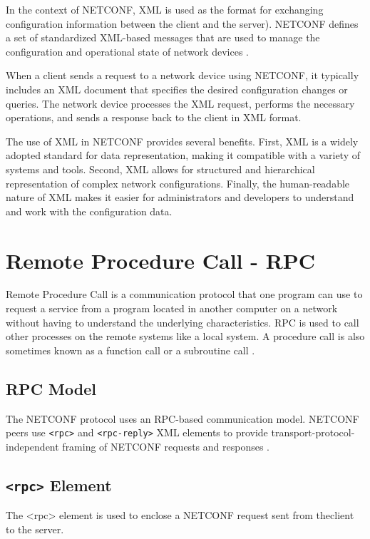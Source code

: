 In the context of NETCONF, XML is used as the format for exchanging configuration information between the client and the server). NETCONF defines a set of standardized XML-based messages that are used to manage the configuration and operational state of network devices \cite{huawei}.

When a client sends a request to a network device using NETCONF, it typically includes an XML document that specifies the desired configuration changes or queries. The network device processes the XML request, performs the necessary operations, and sends a response back to the client in XML format.

The use of XML in NETCONF provides several benefits. First, XML is a widely adopted standard for data representation, making it compatible with a variety of systems and tools. Second, XML allows for structured and hierarchical representation of complex network configurations. Finally, the human-readable nature of XML makes it easier for administrators and developers to understand and work with the configuration data.


\section{Remote Procedure Call - RPC}
Remote Procedure Call is a communication protocol that one program can use to request a service from a program located in another computer on a network without having to understand the underlying characteristics. RPC is used to call other processes on the remote systems like a local system. A procedure call is also sometimes known as a function call or a subroutine call \cite{techrpc}.

\subsection{RPC Model}

The NETCONF protocol uses an RPC-based communication model. NETCONF peers use \texttt{<rpc>} and \texttt{<rpc-reply>} XML elements to provide transport-protocol-independent framing of NETCONF requests and responses \cite{RFC6241N71}.

\subsection{\texttt{<rpc>} Element}
The \textless{rpc}\textgreater{} element is used to enclose a NETCONF request sent from theclient to the server.

